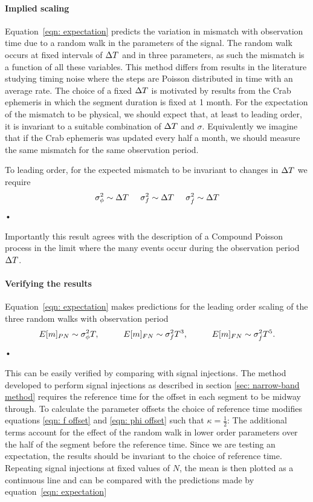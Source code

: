 \paragraph{Implied scaling}
Equation~\eqref{eqn: expectation} predicts the variation in mismatch with
observation time due to a random walk in the parameters of the signal. The
random walk occurs at fixed intervals of $\Delta T$ and in three parameters, as such
the mismatch is a function of all these variables. This method differs from
results in the literature studying timing noise \citep{Cordes1981} where the
steps are Poisson distributed in time with an average rate. The choice of a
fixed $\Delta T$ is motivated by results from the Crab ephemeris in which the
segment duration is fixed at 1 month. For the expectation of the mismatch to be
physical, we should expect that, at least to leading order, it
is invariant to a suitable combination of $\Delta T$ and $\sigma$.  Equivalently we
imagine that if the Crab ephemeris was updated every half a month, we
should measure the same mismatch for the same observation period. 

To leading order, for the expected mismatch to be invariant to changes in $\Delta T$
we require
\begin{equation}
\sigma_{\phi}^{2} \sim \Delta T \;\;\;\;\; \sigma_{f}^{2} \sim \Delta T \;\;\;\;\; \sigma_{\dot{f}}^{2} \sim \Delta T 
\end{equation}•

Importantly this result agrees with the description of a Compound Poisson
process in the limit where the many events occur during the observation period
$\Delta T$.

\paragraph{Verifying the results}
Equation~\eqref{eqn: expectation} makes predictions for the leading order
scaling of the three random walks with observation period
\begin{equation}
E[m]_{PN} \sim \sigP T, \hspace{10mm}  
E[m]_{FN} \sim \sigF T^{3}, \hspace{10mm}  
E[m]_{FN} \sim \sigS T^{5}.
\end{equation}•

This can be easily verified by comparing with signal injections. The method
developed to perform signal injections as described in section \ref{sec: narrow-band method} requires the reference time for the offset in each segment to be
midway through. To calculate the parameter offsets the choice of reference time
modifies equations \eqref{eqn: f offset} and \eqref{eqn: phi offset} such that
$\kappa=\frac{1}{2}$: The additional terms account for the effect of the random
walk in lower order parameters over the half of the segment before the
reference time. Since we are testing an expectation, the results should be
invariant to the choice of reference time. Repeating signal injections at fixed
values of $N$, the mean is then plotted as a continuous line and can be
compared with the predictions made by equation~\eqref{eqn: expectation}

